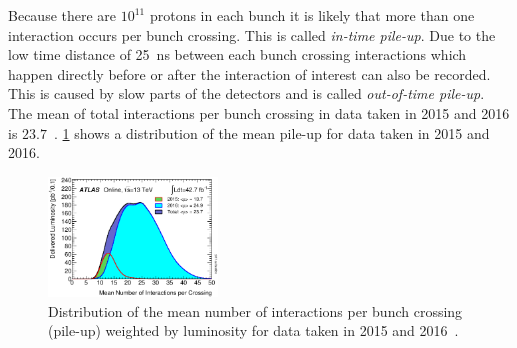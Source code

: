 Because there are $10^{11}$ protons in each bunch it is likely that more than one interaction occurs per bunch crossing.
This is called \emph{in-time pile-up}.
Due to the low time distance of \SI{25}{\ns} between each bunch crossing interactions which happen directly before or after
the interaction of interest can also be recorded.
This is caused by slow parts of the detectors and is called \emph{out-of-time pile-up}.
The mean of total interactions per bunch crossing in data taken in 2015 and 2016 is $23.7$~\cite{PublicLumiRun2}.
\cref{fig:setup:pileup} shows a distribution of the mean pile-up for data taken in 2015 and 2016.

\begin{figure}[htb]
    \centering
    \includegraphics[width=0.4\textwidth]{./figures/setup/pileup_2015_2016.eps}
    \caption{Distribution of the mean number of interactions per bunch crossing (pile-up)
             weighted by luminosity for data taken in 2015 and 2016~\cite{PublicLumiRun2}.}\label{fig:setup:pileup}
\end{figure}
